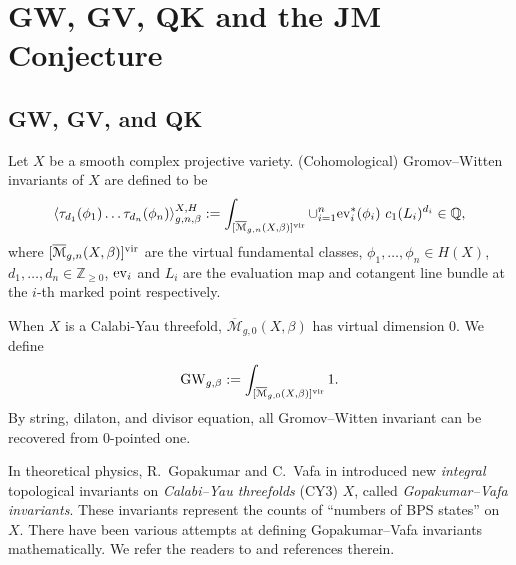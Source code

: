 \documentclass[11pt]{amsart}
\newtheorem*{main theorem*}{Main Theorem}
\theoremstyle{remark}
\numberwithin{equation}{section}
\newcommand{\M}{\overline{\mathcal{M}}}
\newcommand{\vir}{{\rm vir}}
\newcommand{\ev}{{\rm ev}}
\newcommand{\GW}{{\mathrm{GW}}}
\newcommand{\GV}{{\mathrm{GV}}}
\begin{document}
\section{GW, GV, QK and the JM Conjecture} \label{s:1}


\subsection{GW, GV, and QK}
Let $X$ be a smooth complex projective variety. 
(Cohomological) Gromov--Witten invariants of $X$ are defined to be
\[
\langle \tau_{d_1}(\phi_1)\dots \tau_{d_n}(\phi_n) \rangle^{X, {H}}_{g,n,\beta} := \int_{[\M_{g,n}(X,\beta)]^{\vir}}   \cup_{i=1}^n \ev_i^*(\phi_i) \ c_1(L_i)^{d_i} \in \mathbb{Q},
\]
where $[\M_{g,n}(X,\beta)]^{\vir}$ are the virtual fundamental classes, $\phi_1,\dots,\phi_n \in H(X)$, $d_1,\dots,d_n \in \mathbb{Z}_{\geq 0}$, $\ev_i$ and $L_i$ are the evaluation map and cotangent line bundle at the $i$-th marked point respectively. 

When $X$ is a Calabi-Yau threefold, $\M_{g,0}(X,\beta)$ has virtual dimension 0. We define 
\[
 {\GW}_{g, \beta} := \int_{[\M_{g,0}(X,\beta)]^{\vir} } 1 .
\]
By string, dilaton, and divisor equation, all Gromov--Witten invariant can be recovered from 0-pointed one.

In theoretical physics,     R.~Gopakumar and C.~Vafa in \cite{Gopakumar_Vafa_1998} introduced new \emph{integral} topological invariants on \emph{Calabi--Yau threefolds} (CY3) $X$, called \emph{Gopakumar--Vafa invariants}. These invariants represent the counts of ``numbers of BPS states'' on $X$. There have been various attempts at defining Gopakumar--Vafa invariants mathematically. We refer the readers to \cite{Maulik_Toda_2018} and references therein. 
\end{document}
